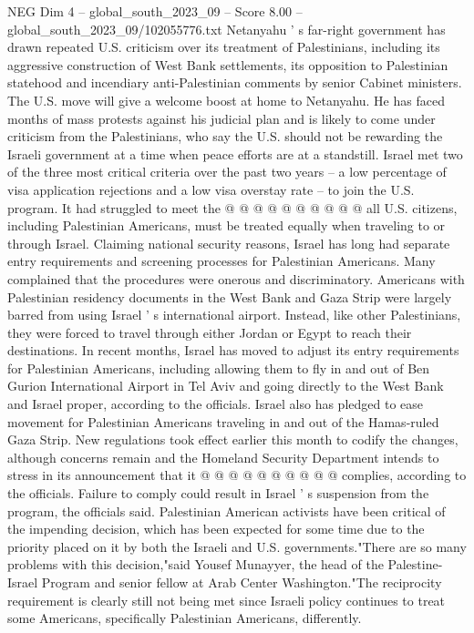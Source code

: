 \begin{textsample}{NEG Dim 4 – global\_south\_2023\_09 – Score 8.00 – global\_south\_2023\_09/102055776.txt}
Netanyahu ' s far-right government has drawn repeated U.S. criticism over its treatment of Palestinians, including its aggressive construction of West Bank settlements, its opposition to Palestinian statehood and incendiary anti-Palestinian comments by senior Cabinet ministers.
The U.S. move will give a welcome boost at home to Netanyahu.
He has faced months of mass protests against his judicial plan and is likely to come under criticism from the Palestinians, who say the U.S. should not be rewarding the Israeli government at a time when peace efforts are at a standstill.
Israel met two of the three most critical criteria over the past two years -- a low percentage of visa application rejections and a low visa overstay rate -- to join the U.S. program.
It had struggled to meet the @ @ @ @ @ @ @ @ @ @ all U.S. citizens, including Palestinian Americans, must be treated equally when traveling to or through Israel.
Claiming national security reasons, Israel has long had separate entry requirements and screening processes for Palestinian Americans.
Many complained that the procedures were onerous and discriminatory.
Americans with Palestinian residency documents in the West Bank and Gaza Strip were largely barred from using Israel ' s international airport.
Instead, like other Palestinians, they were forced to travel through either Jordan or Egypt to reach their destinations.
In recent months, Israel has moved to adjust its entry requirements for Palestinian Americans, including allowing them to fly in and out of Ben Gurion International Airport in Tel Aviv and going directly to the West Bank and Israel proper, according to the officials.
Israel also has pledged to ease movement for Palestinian Americans traveling in and out of the Hamas-ruled Gaza Strip.
New regulations took effect earlier this month to codify the changes, although concerns remain and the Homeland Security Department intends to stress in its announcement that it @ @ @ @ @ @ @ @ @ @ complies, according to the officials.
Failure to comply could result in Israel ' s suspension from the program, the officials said.
Palestinian American activists have been critical of the impending decision, which has been expected for some time due to the priority placed on it by both the Israeli and U.S. governments."There are so many problems with this decision,"said Yousef Munayyer, the head of the Palestine-Israel Program and senior fellow at Arab Center Washington."The reciprocity requirement is clearly still not being met since Israeli policy continues to treat some Americans, specifically Palestinian Americans, differently.

\end{textsample}
